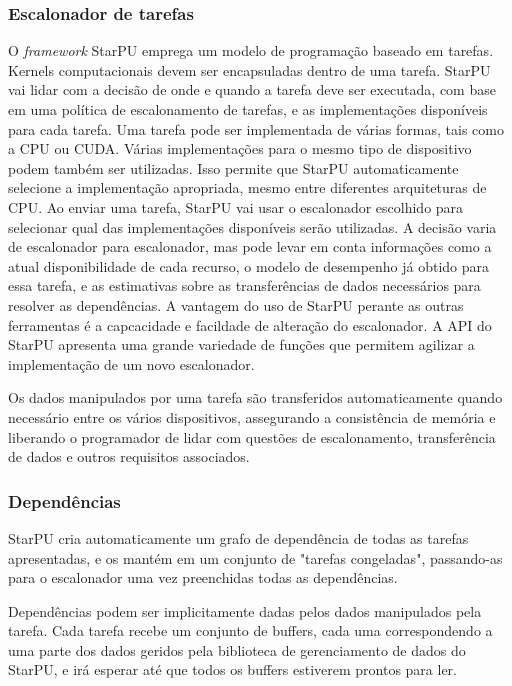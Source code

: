 \subsubsection{Escalonador de tarefas}

O \textit{framework} StarPU emprega um modelo de programação baseado em tarefas. Kernels computacionais devem ser encapsuladas dentro de uma tarefa. StarPU vai lidar com a decisão de onde e quando a tarefa deve ser executada, com base em uma política de escalonamento de tarefas, e as implementações disponíveis para cada tarefa. Uma tarefa pode ser implementada de várias formas, tais como a CPU ou CUDA. Várias implementações para o mesmo tipo de dispositivo podem também ser utilizadas. Isso permite que StarPU automaticamente selecione a implementação apropriada, mesmo entre diferentes arquiteturas de CPU. Ao enviar uma tarefa, StarPU vai usar o escalonador escolhido para selecionar qual das implementações disponíveis serão utilizadas. A decisão varia de escalonador para escalonador, mas pode levar em conta informações como a atual disponibilidade de cada recurso, o modelo de desempenho já obtido para essa tarefa, e as estimativas sobre as transferências de dados necessários para resolver as dependências. A vantagem do uso de StarPU perante as outras ferramentas é a capcacidade e facildade de alteração do escalonador. A API do StarPU apresenta uma grande variedade de funções que permitem agilizar a implementação de um novo escalonador.

Os dados manipulados por uma tarefa são transferidos automaticamente quando necessário entre os vários dispositivos, assegurando a consistência de memória e liberando o programador de lidar com questões de escalonamento, transferência de dados e outros requisitos associados.

\subsubsection{Dependências}

StarPU cria automaticamente um grafo de dependência de todas as tarefas apresentadas, e os mantém em um conjunto de "tarefas congeladas", passando-as para o escalonador uma vez preenchidas todas as dependências. 

Dependências podem ser implicitamente dadas pelos dados manipulados pela tarefa. Cada tarefa recebe um conjunto de buffers, cada uma correspondendo a uma parte dos dados geridos pela  biblioteca de gerenciamento de dados do StarPU, e irá esperar até que todos os buffers estiverem prontos para ler.

